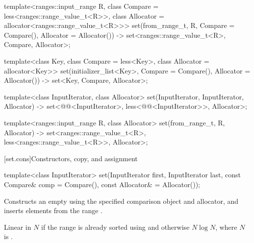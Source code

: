 \documentclass{wg21}
\begin{document}
\begin{addedblock}
\begin{codeblock}
    template<ranges::input_range R, class Compare = less<ranges::range_value_t<R>>,
        class Allocator = allocator<ranges::range_value_t<R>>>
    set(from_range_t, R, Compare = Compare(), Allocator = Allocator())
    -> set<ranges::range_value_t<R>,  Compare, Allocator>;
\end{codeblock}
\end{addedblock}
\begin{codeblock}

    template<class Key, class Compare = less<Key>, class Allocator = allocator<Key>>
    set(initializer_list<Key>, Compare = Compare(), Allocator = Allocator())
    -> set<Key, Compare, Allocator>;

    template<class InputIterator, class Allocator>
    set(InputIterator, InputIterator, Allocator)
    -> set<@@<InputIterator>,
    less<@@<InputIterator>>, Allocator>;

\end{codeblock}
\begin{addedblock}
\begin{codeblock}
    template<ranges::input_range R,  class Allocator>
    set(from_range_t, R, Allocator)
    -> set<ranges::range_value_t<R>,  less<ranges::range_value_t<R>>, Allocator>;
\end{codeblock}
\end{addedblock}
\begin{codeblock}

    template<class Key, class Allocator>
    set(initializer_list<Key>, Allocator) -> set<Key, less<Key>, Allocator>;
}
\end{codeblock}%
%

[set.cons]{Constructors, copy, and assignment}

%
\begin{itemdecl}
    template<class InputIterator>
    set(InputIterator first, InputIterator last,
    const Compare& comp = Compare(), const Allocator& = Allocator());
\end{itemdecl}

\begin{itemdescr}
    \pnum
    \effects
    Constructs an empty
    using the specified comparison object and allocator,
    and inserts elements from the range
    .

    \pnum
    \complexity
    Linear in $N$ if the range
    is already sorted using 
    and otherwise $N \log N$,
    where $N$ is
    .
\end{itemdescr}
\end{document}

